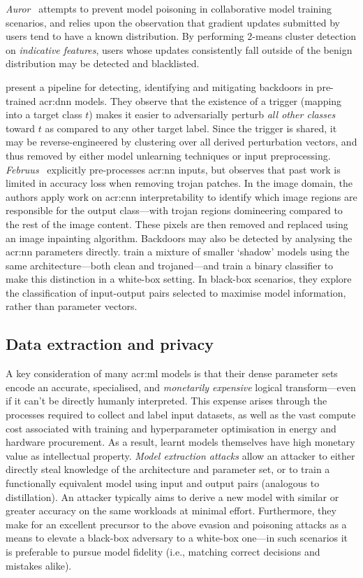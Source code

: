 \emph{Auror}~\parencite{DBLP:conf/acsac/ShenTS16} attempts to prevent model poisoning in collaborative model training scenarios, and relies upon the observation that gradient updates submitted by users tend to have a known distribution.
By performing 2-means cluster detection on \emph{indicative features}, users whose updates consistently fall outside of the benign distribution may be detected and blacklisted.

\Textcite{DBLP:conf/sp/WangYSLVZZ19} present a pipeline for detecting, identifying and mitigating backdoors in pre-trained \gls{acr:dnn} models.
They observe that the existence of a trigger (mapping into a target class $t$) makes it easier to adversarially perturb \emph{all other classes} toward $t$ as compared to any other target label.
Since the trigger is shared, it may be reverse-engineered by clustering over all derived perturbation vectors, and thus removed by either model unlearning techniques or input preprocessing.
\emph{Februus}~\parencite{DBLP:conf/acsac/DoanAR20} explicitly pre-processes \gls{acr:nn} inputs, but observes that past work is limited in accuracy loss when removing trojan patches.
In the image domain, the authors apply work on \gls{acr:cnn} interpretability to identify which image regions are responsible for the output class---with trojan regions domineering compared to the rest of the image content.
These pixels are then removed and replaced using an image inpainting algorithm.
Backdoors may also be detected by analysing the \gls{acr:nn} parameters directly.
\Textcite{DBLP:conf/sp/XuWLBGL21} train a mixture of smaller `shadow' models using the same architecture---both clean and trojaned---and train a binary classifier to make this distinction in a white-box setting.
In black-box scenarios, they explore the classification of input-output pairs selected to maximise model information, rather than parameter vectors.

\subsection{Data extraction and privacy}\label{sec:data-extraction-and-privacy}
A key consideration of many \gls{acr:ml} models is that their dense parameter sets encode an accurate, specialised, and \emph{monetarily expensive} logical transform---even if it can't be directly humanly interpreted.
This expense arises through the processes required to collect and label input datasets, as well as the vast compute cost associated with training and hyperparameter optimisation in energy and hardware procurement.
As a result, learnt models themselves have high monetary value as intellectual property.
\emph{Model extraction attacks} allow an attacker to either directly steal knowledge of the architecture and parameter set, or to train a functionally equivalent model using input and output pairs (analogous to distillation).
An attacker typically aims to derive a new model with similar or greater accuracy on the same workloads at minimal effort.
Furthermore, they make for an excellent precursor to the above evasion and poisoning attacks as a means to elevate a black-box adversary to a white-box one---in such scenarios it is preferable to pursue model fidelity (i.e., matching correct decisions and mistakes alike).

